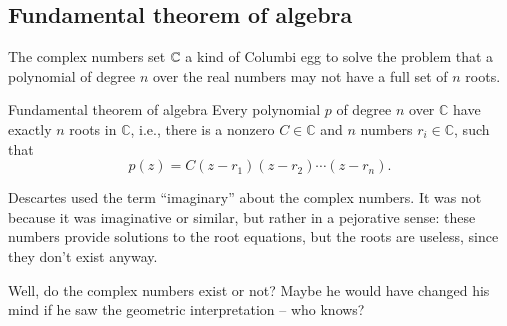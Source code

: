 \subsection{Fundamental theorem of algebra}

The complex numbers set $\mathbb{C}$ a kind of Columbi egg to solve the problem that a polynomial of degree $n$ over the real numbers may not have a full set of $n$ roots. 
\begin{myTheorem}{Fundamental theorem of algebra}{}
    Every polynomial $p$ of degree $n$ over $\mathbb{C}$ have exactly $n$ roots in $\mathbb{C}$, i.e., there is a nonzero $C \in \mathbb{C}$ and $n$ numbers $r_i \in \mathbb{C}$, such that
    \[ p(z) = C (z-r_1)(z-r_2)\cdots (z-r_n). \]
\end{myTheorem}
Descartes used the term ``imaginary'' about the complex numbers. It was not because it was imaginative or similar, but rather in a pejorative sense: these numbers provide solutions to the root equations, but the roots are useless, since they don't exist anyway.

Well, do the complex numbers exist or not? Maybe he would have changed his mind if he saw the geometric interpretation -- who knows?
